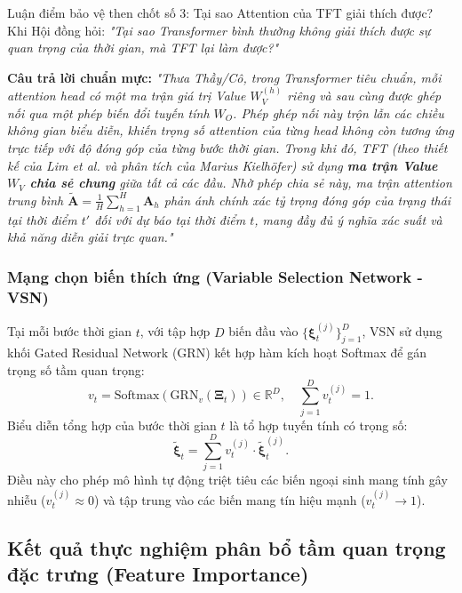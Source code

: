 \documentclass[12pt,a4paper,oneside]{article}
\begin{document}
\begin{defensebox}{Luận điểm bảo vệ then chốt số 3: Tại sao Attention của TFT giải thích được?}
    Khi Hội đồng hỏi: \textit{"Tại sao Transformer bình thường không giải thích được sự quan trọng của thời gian, mà TFT lại làm được?"}
    
    \textbf{Câu trả lời chuẩn mực:}
    \textit{"Thưa Thầy/Cô, trong Transformer tiêu chuẩn, mỗi attention head có một ma trận giá trị Value $W_V^{(h)}$ riêng và sau cùng được ghép nối qua một phép biến đổi tuyến tính $W_O$. Phép ghép nối này trộn lẫn các chiều không gian biểu diễn, khiến trọng số attention của từng head không còn tương ứng trực tiếp với độ đóng góp của từng bước thời gian. 
    Trong khi đó, TFT (theo thiết kế của Lim et al. và phân tích của Marius Kielh\"{o}fer) sử dụng \textbf{ma trận Value $W_V$ chia sẻ chung} giữa tất cả các đầu. Nhờ phép chia sẻ này, ma trận attention trung bình $\tilde{\mathbf{A}} = \frac{1}{H}\sum_{h=1}^H \mathbf{A}_h$ phản ánh chính xác tỷ trọng đóng góp của trạng thái tại thời điểm $t'$ đối với dự báo tại thời điểm $t$, mang đầy đủ ý nghĩa xác suất và khả năng diễn giải trực quan."}
\end{defensebox}

\subsubsection{Mạng chọn biến thích ứng (Variable Selection Network - VSN)}

Tại mỗi bước thời gian $t$, với tập hợp $D$ biến đầu vào $\{\bm{\xi}_t^{(j)}\}_{j=1}^D$, VSN sử dụng khối Gated Residual Network (GRN) kết hợp hàm kích hoạt Softmax để gán trọng số tầm quan trọng:
\begin{equation}
    v_t = \text{Softmax}\left( \text{GRN}_{v}\left( \bm{\Xi}_t \right) \right) \in \mathbb{R}^D, \quad \sum_{j=1}^D v_t^{(j)} = 1.
    \label{eq:vsn_weights}
\end{equation}
Biểu diễn tổng hợp của bước thời gian $t$ là tổ hợp tuyến tính có trọng số:
\begin{equation}
    \tilde{\bm{\xi}}_t = \sum_{j=1}^D v_t^{(j)} \cdot \tilde{\bm{\xi}}_t^{(j)}.
    \label{eq:vsn_aggregation}
\end{equation}
Điều này cho phép mô hình tự động triệt tiêu các biến ngoại sinh mang tính gây nhiễu ($v_t^{(j)} \approx 0$) và tập trung vào các biến mang tín hiệu mạnh ($v_t^{(j)} \rightarrow 1$).

\subsection{Kết quả thực nghiệm phân bổ tầm quan trọng đặc trưng (Feature Importance)}
\end{document}
